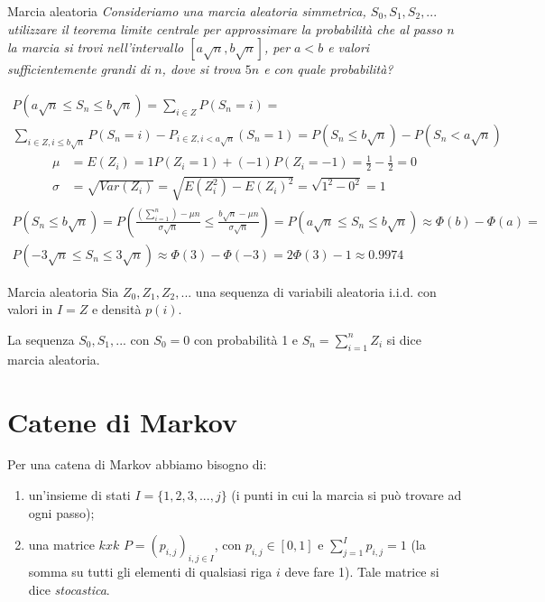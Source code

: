 \begin{Example}{Marcia aleatoria}{}
    \textit{Consideriamo una marcia aleatoria simmetrica, $S_0, S_1, S_2, ...$ utilizzare il teorema limite centrale per approssimare la probabilità che al passo $n$ la marcia si trovi nell'intervallo $[a\sqrt{n}, b\sqrt{n}]$, per $a<b$ e valori sufficientemente grandi di $n$, dove si trova $5n$ e con quale probabilità?}

    \begin{align*}
        P(a\sqrt{n}\leq S_n\leq b\sqrt{n})=\sum_{i\in Z}P(S_n=i)=\\\sum_{i\in Z, i\leq b\sqrt{n}}P(S_n=i)-P_{i\in Z, i<a\sqrt{n}}(S_n=1)=P(S_n\leq b\sqrt{n})-P(S_n<a\sqrt{n})
    \end{align*}
    \begin{align*}
        \mu&=E(Z_i)=1P(Z_i=1)+(-1)P(Z_i=-1)=\frac{1}{2}-\frac{1}{2}=0\\
        \sigma&=\sqrt{Var(Z_i)}=\sqrt{E(Z_i^2)-E(Z_i)^2}=\sqrt{1^2-0^2}=1
    \end{align*}
    \begin{align*}
        P(S_n\leq b\sqrt{n})=P\left(\frac{(\sum^n_{i=1})-\mu n}{\sigma\sqrt{n}}\leq \frac{b\sqrt{n}-\mu n}{\sigma\sqrt{n}}\right)=P(a\sqrt{n}\leq S_n\leq b\sqrt{n})\approx\Phi(b)-\Phi(a)=\\P(-3\sqrt{n}\leq S_n\leq 3\sqrt{n})\approx\Phi(3)-\Phi(-3)=2\Phi(3)-1\approx 0.9974
    \end{align*}
\end{Example}

\begin{Definition}{Marcia aleatoria}{}
    Sia $Z_0, Z_1, Z_2, ...$ una sequenza di variabili aleatoria i.i.d. con valori in $I=Z$ e densità $p(i)$.

    La sequenza $S_0, S_1, ...$ con $S_0=0$ con probabilità 1 e $S_n=\sum^n_{i=1}Z_i$ si dice marcia aleatoria.
\end{Definition}

\section{Catene di Markov}


Per una catena di Markov abbiamo bisogno di:
\begin{enumerate}
    \item un'insieme di stati $I=\{1,2,3,...,j\}$ (i punti in cui la marcia si può trovare ad ogni passo);
    \item una matrice $kxk$ $P=(p_{i,j})_{i,j\in I}$, con $p_{i,j}\in[0,1]$ e $\sum_{j=1}^Ip_{i,j}=1$ (la somma su tutti gli elementi di qualsiasi riga $i$ deve fare 1). Tale matrice si dice \textit{stocastica}.
\end{enumerate}


